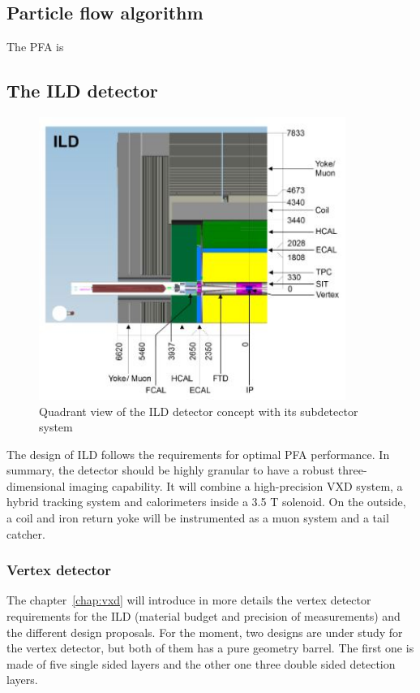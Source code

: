     \subsection{Particle flow algorithm}
    \label{subsec:PFA}

    The \gls{PFA} is 
    
    \subsection{The ILD detector}
    
    \begin{figure}
      \centering
      \includegraphics[width = 10cm]{Pictures/ILC/fig_ILD_Quadrant.png}
      \caption{Quadrant view of the ILD detector concept with its subdetector system}
      \label{fig:ILD}
    \end{figure}

    The design of \gls{ILD} follows the requirements for optimal \gls{PFA} performance.
    In summary, the detector should be highly granular to have a robust three-dimensional imaging capability.
    It will combine a high-precision \gls{VXD} system, a hybrid tracking system and calorimeters inside a 3.5 T solenoid. 
    On the outside, a coil and iron return yoke will be instrumented as a muon system and a tail catcher.

      \subsubsection{Vertex detector}

      The chapter~\ref{chap:vxd} will introduce in more details the vertex detector requirements for the \gls{ILD} (material budget and precision of measurements) and the different design proposals. 
      For the moment, two designs are under study for the vertex detector, but both of them has a pure geometry barrel.
      The first one is made of five single sided layers and the other one three double sided detection layers.

